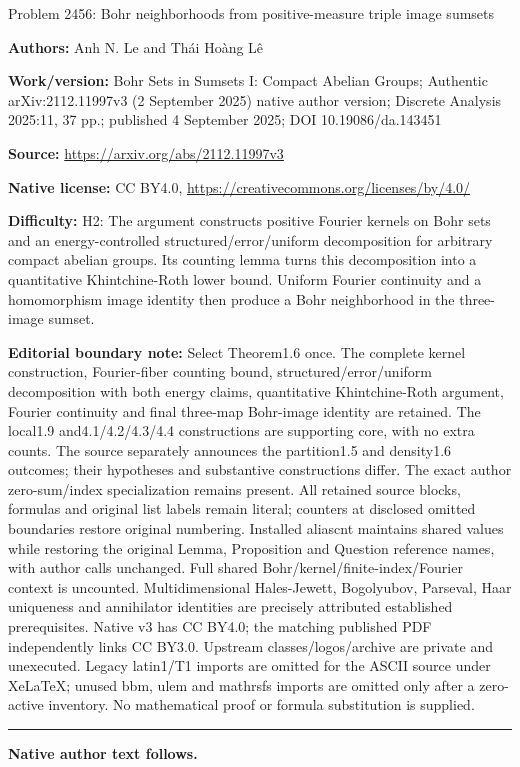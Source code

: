 \documentclass[10pt]{article}
\theoremstyle{definition}
\begin{document}
\begin{center}\Large Problem 2456: Bohr neighborhoods from positive-measure triple image sumsets\end{center}\noindent\textbf{Authors:} Anh N. Le and Thái Hoàng Lê\par\noindent\textbf{Work/version:} Bohr Sets in Sumsets I: Compact Abelian Groups; Authentic arXiv:2112.11997v3 (2 September 2025) native author version; Discrete Analysis 2025:11, 37 pp.; published 4 September 2025; DOI 10.19086/da.143451\par\noindent\textbf{Source:} \url{https://arxiv.org/abs/2112.11997v3}\par\noindent\textbf{Native license:} CC BY4.0, \url{https://creativecommons.org/licenses/by/4.0/}\par\noindent\textbf{Difficulty:} H2: The argument constructs positive Fourier kernels on Bohr sets and an energy-controlled structured/error/uniform decomposition for arbitrary compact abelian groups. Its counting lemma turns this decomposition into a quantitative Khintchine-Roth lower bound. Uniform Fourier continuity and a homomorphism image identity then produce a Bohr neighborhood in the three-image sumset.\par\medskip\noindent\textbf{Editorial boundary note:} Select Theorem1.6 once. The complete kernel construction, Fourier-fiber counting bound, structured/error/uniform decomposition with both energy claims, quantitative Khintchine-Roth argument, Fourier continuity and final three-map Bohr-image identity are retained. The local1.9 and4.1/4.2/4.3/4.4 constructions are supporting core, with no extra counts. The source separately announces the partition1.5 and density1.6 outcomes; their hypotheses and substantive constructions differ. The exact author zero-sum/index specialization remains present. All retained source blocks, formulas and original list labels remain literal; counters at disclosed omitted boundaries restore original numbering. Installed aliascnt maintains shared values while restoring the original Lemma, Proposition and Question reference names, with author calls unchanged. Full shared Bohr/kernel/finite-index/Fourier context is uncounted. Multidimensional Hales-Jewett, Bogolyubov, Parseval, Haar uniqueness and annihilator identities are precisely attributed established prerequisites. Native v3 has CC BY4.0; the matching published PDF independently links CC BY3.0. Upstream classes/logos/archive are private and unexecuted. Legacy latin1/T1 imports are omitted for the ASCII source under XeLaTeX; unused bbm, ulem and mathrsfs imports are omitted only after a zero-active inventory. No mathematical proof or formula substitution is supplied.\par\medskip\hrule\medskip\noindent\textbf{Native author text follows.}\par
\end{document}
